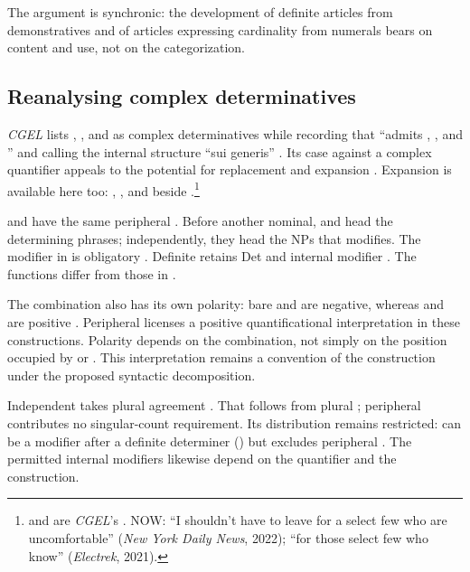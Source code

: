 \documentclass[12pt]{article}
\begin{document}
The argument is synchronic: the development of definite articles from demonstratives and of articles expressing cardinality from numerals \citep[331--336]{lyons1999} bears on content and use, not on the categorization.

\subsection{Reanalysing complex determinatives}\label{sec:complex-determinatives}

\textit{CGEL} lists , , and  as complex determinatives while recording that  \enquote{admits , , and } and calling the internal structure \enquote{sui generis} \citep[392, 394]{huddleston2002}. Its case against a complex quantifier  appeals to the potential for replacement and expansion \citep[351--352]{huddleston2002}. Expansion is available here too: , , and  beside .\footnote{ and  are \textit{CGEL}'s \citep[392]{huddleston2002}. NOW: \enquote{I shouldn't have to leave for a select few who are uncomfortable} (\textit{New York Daily News}, 2022); \enquote{for those select few who know} (\textit{Electrek}, 2021).}

 and  have the same peripheral . Before another nominal,  and  head the determining phrases; independently, they head the NPs that  modifies. The modifier in  is obligatory \citep[394]{huddleston2002}. Definite  retains Det  and internal modifier  \citep[392]{huddleston2002}. The functions differ from those in .

The combination also has its own polarity: bare  and  are negative, whereas  and  are positive \citep[393--394]{huddleston2002}. Peripheral  licenses a positive quantificational interpretation in these constructions. Polarity depends on the combination, not simply on the position occupied by  or . This interpretation remains a convention of the construction under the proposed syntactic decomposition.

Independent  takes plural agreement \citep[392]{huddleston2002}. That follows from plural ; peripheral  contributes no singular-count requirement. Its distribution remains restricted:  can be a modifier after a definite determiner () \citep[392]{huddleston2002} but excludes peripheral . The permitted internal modifiers likewise depend on the quantifier and the construction.
\end{document}
